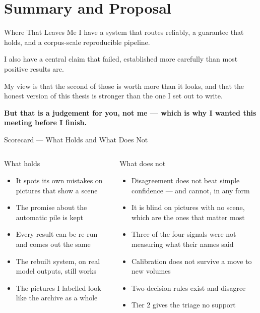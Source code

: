 \documentclass[aspectratio=169,11pt]{beamer}
\begin{document}
\section{Summary and Proposal}

\begin{frame}{Where That Leaves Me}
\large
I have a system that routes reliably, a guarantee that holds, and a corpus-scale reproducible pipeline.
\vspace{3mm}

I also have a central claim that failed, established more carefully than most positive results are.
\vspace{4mm}

\normalsize My view is that the second of those is worth more than it looks, and that the honest version of this thesis is stronger than the one I set out to write.
\vspace{3mm}

\textbf{But that is a judgement for you, not me --- which is why I wanted this meeting before I finish.}
\end{frame}


\begin{frame}{Scorecard --- What Holds and What Does Not}
\small
\begin{columns}[T]
\begin{exampleblock}{\small What holds}
\footnotesize
\begin{itemize}
  \setlength\itemsep{1.2mm}
  \item It spots its own mistakes on pictures that show a scene
  \item The promise about the automatic pile is kept
  \item Every result can be re-run and comes out the same
  \item The rebuilt system, on real model outputs, still works
  \item The pictures I labelled look like the archive as a whole
\end{itemize}
\end{exampleblock}

\begin{alertblock}{\small What does not}
\footnotesize
\begin{itemize}
  \setlength\itemsep{1.2mm}
  \item Disagreement does not beat simple confidence --- and cannot, in any form
  \item It is blind on pictures with no scene, which are the ones that matter most
  \item Three of the four signals were not measuring what their names said
  \item Calibration does not survive a move to new volumes
  \item Two decision rules exist and disagree
  \item Tier 2 gives the triage no support
\end{itemize}
\end{alertblock}
\end{columns}
\end{frame}
\end{document}
